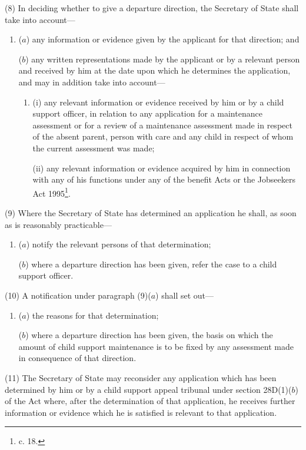 \documentclass[a4paper]{article}
\begin{document}
(8) In deciding whether to give a departure direction, the Secretary of State
shall take into account—
\begin{enumerate}\item[]
($a$) any information or evidence given by the applicant for that direction; and

($b$) any written representations made by the applicant or by a relevant person and
received by him at the date upon which he determines the application, and may in
addition take into account—
\begin{enumerate}\item[]
(i) any relevant information or evidence received by him or by a child support
officer, in relation to any application for a maintenance assessment or for a
review of a maintenance assessment made in respect of the absent parent, person
with care and any child in respect of whom the current assessment was made;

(ii) any relevant information or evidence acquired by him in connection with any
of his functions under any of the benefit Acts or the Jobseekers Act 1995\footnote{ c. 18.}.
\end{enumerate}
\end{enumerate}

(9) Where the Secretary of State has determined an application he shall, as soon
as is reasonably practicable—
\begin{enumerate}\item[]
($a$) notify the relevant persons of that determination;

($b$) where a departure direction has been given, refer the case to a child support
officer.
\end{enumerate}

(10) A notification under paragraph (9)($a$) shall set out—
\begin{enumerate}\item[]
($a$) the reasons for that determination;

($b$) where a departure direction has been given, the basis on which the amount of
child support maintenance is to be fixed by any assessment made in consequence
of that direction.
\end{enumerate}

(11) The Secretary of State may reconsider any application which has been
determined by him or by a child support appeal tribunal under section 28D(1)($b$)
of the Act where, after the determination of that application, he receives
further information or evidence which he is satisfied is relevant to that
application.
\end{document}
